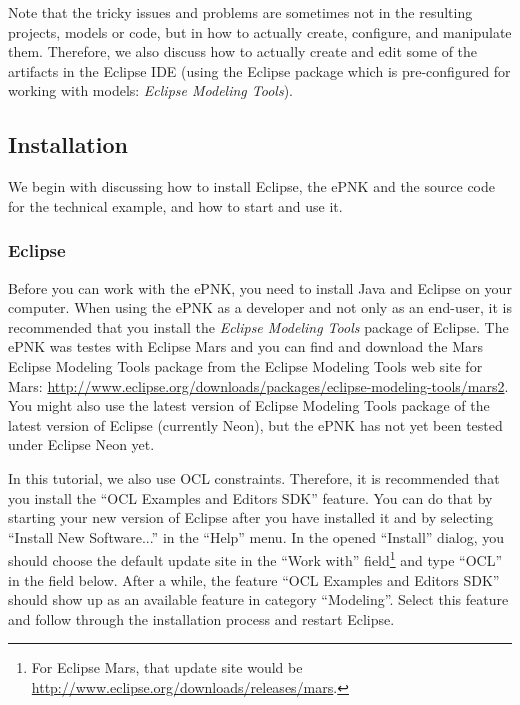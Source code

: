 Note that the tricky issues and problems are sometimes not in the resulting
projects, models or code, but in how to actually create, configure, and
manipulate them. Therefore, we also discuss how to actually create
and edit some of the artifacts in the Eclipse IDE (using the Eclipse package
which is pre-configured for working with models: \emph{Eclipse Modeling Tools}).


\subsection{Installation}
\label{sec:tutorial:technical:install}

We begin with discussing how to install Eclipse, the ePNK and the source code
for the technical example, and how to start and use it.

\subsubsection{Eclipse}
\label{sec:tutorial:technical:install:eclipse}

Before you can work with the ePNK, you need to install Java and Eclipse on your
computer. When using the ePNK as a developer and not only as an end-user, it is
recommended that you install the \emph{Eclipse Modeling Tools} package of
Eclipse. The ePNK was testes with Eclipse Mars and you can find and download the
Mars Eclipse Modeling Tools package from the Eclipse Modeling Tools web site for
Mars:
\url{http://www.eclipse.org/downloads/packages/eclipse-modeling-tools/mars2}.
You might also use the latest version of Eclipse Modeling Tools package of the
latest version of Eclipse (currently Neon), but the ePNK has not yet been tested
under Eclipse Neon yet.

In this tutorial, we also use OCL constraints. Therefore, it is recommended that
you install the ``OCL Examples and Editors SDK'' feature. You can do that
by starting your new version of Eclipse after you have installed it and by 
selecting ``Install New Software...'' in the ``Help'' menu. In the opened 
``Install'' dialog, you should choose the default update site in the ``Work with''
field\footnote
  {For Eclipse Mars, that update site would be
   \url{http://www.eclipse.org/downloads/releases/mars}.}
and type ``OCL'' in the field below. After a while, the feature ``OCL Examples
and Editors SDK'' should show up as an available feature in category
``Modeling''. Select this feature and follow through the installation process
and restart Eclipse.


